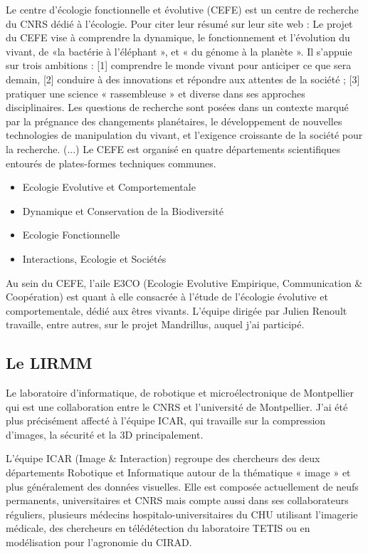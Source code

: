 \documentclass[a4paper,12pt]{article}
\begin{document}
Le centre d'écologie fonctionnelle et évolutive (CEFE) est un centre de recherche du CNRS dédié à l'écologie. Pour citer leur résumé sur leur site web \cite{cefe}: 
Le projet du CEFE vise à comprendre la dynamique, le fonctionnement et l’évolution du vivant, de «la bactérie à l’éléphant », et « du génome à la planète ». Il s’appuie sur trois ambitions : [1] comprendre le monde vivant pour anticiper ce que sera demain, [2] conduire à des innovations et répondre aux attentes de la société ; [3] pratiquer une science « rassembleuse » et diverse dans ses approches disciplinaires. Les questions de recherche sont posées dans un contexte marqué par la prégnance des changements planétaires, le développement de nouvelles technologies de manipulation du vivant, et l’exigence croissante de la société pour la recherche.\newline
(...)\newline
Le CEFE est organisé en quatre départements scientifiques entourés de plates-formes techniques communes. 

\begin{itemize}
    \item Ecologie Evolutive et Comportementale
    \item Dynamique et Conservation de la Biodiversité
    \item Ecologie Fonctionnelle
    \item Interactions, Ecologie et Sociétés \\
\end{itemize}

Au sein du CEFE, l'aile E3CO (Ecologie Evolutive Empirique, Communication \& Coopération) est quant à elle consacrée à l'étude de l'écologie évolutive et comportementale, dédié aux êtres vivants.
L'équipe dirigée par Julien Renoult travaille, entre autres, sur le projet Mandrillus, auquel j'ai participé.

\subsection{Le LIRMM}

Le laboratoire d'informatique, de robotique et microélectronique de Montpellier qui est une collaboration entre le CNRS et l'université de Montpellier.
J'ai été plus précisément affecté à l'équipe ICAR, qui travaille sur la compression d'images, la sécurité et la 3D principalement.\newline

L’équipe ICAR (Image \& Interaction) regroupe des chercheurs des deux départements Robotique et Informatique autour de la thématique « image » et plus généralement des données visuelles. Elle est composée actuellement de neufs permanents, universitaires et CNRS mais compte aussi dans ses collaborateurs réguliers, plusieurs médecins hospitalo-universitaires du CHU utilisant l’imagerie médicale, des chercheurs en télédétection du laboratoire TETIS ou en modélisation pour l’agronomie du CIRAD.\newline
\end{document}
